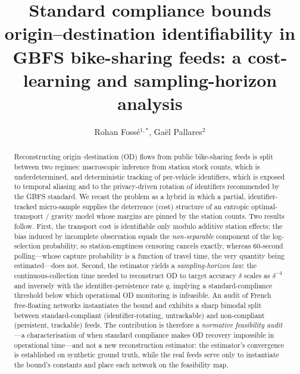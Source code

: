 \title{Standard compliance bounds origin--destination identifiability in
GBFS bike-sharing feeds: a cost-learning and sampling-horizon analysis}

\author{Rohan Foss\'e$^{1,*}$,
        Ga\"el Pallares$^{2}$}




\begin{abstract}
Reconstructing origin--destination (OD) flows from public bike-sharing feeds
is split between two regimes: macroscopic inference from station stock
counts, which is underdetermined, and deterministic tracking of per-vehicle
identifiers, which is exposed to temporal aliasing and to the
privacy-driven rotation of identifiers recommended by the GBFS standard.
We recast the problem as a hybrid in which a partial, identifier-tracked
micro-sample supplies the deterrence (cost) structure of an entropic
optimal-transport / gravity model whose margins are pinned by the station
counts. Two results follow. First, the transport cost is identifiable only
modulo additive station effects; the bias induced by incomplete observation
equals the \emph{non-separable} component of the log-selection probability,
so station-emptiness censoring cancels exactly, whereas 60-second
polling---whose capture probability is a function of travel time, the very
quantity being estimated---does not. Second, the estimator yields a
\emph{sampling-horizon law}: the continuous-collection time needed to
reconstruct OD to target accuracy $\delta$ scales as $\delta^{-4}$ and
inversely with the identifier-persistence rate $q$, implying a
standard-compliance threshold below which operational OD monitoring is
infeasible. An audit of  French free-floating networks instantiates
the bound and exhibits a sharp bimodal split between standard-compliant
(identifier-rotating, untrackable) and non-compliant (persistent, trackable)
feeds. The contribution is therefore a \emph{normative feasibility audit}---a
characterisation of when standard compliance makes OD recovery impossible in
operational time---and not a new reconstruction estimator: the estimator's
convergence is established on synthetic ground truth, while the real feeds serve
only to instantiate the bound's constants and place each network on the
feasibility map.
\end{abstract}

